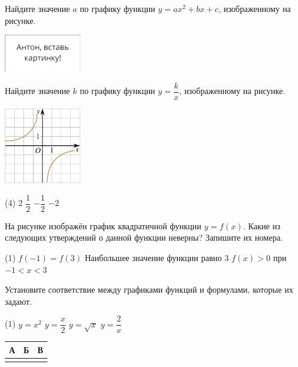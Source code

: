 \begin{class}[number=4]
	\begin{listofex}
	\item Найдите значение \( a \) по графику функции \( y=ax^2+bx+c \), изображенному на рисунке.
	\begin{center}
		\includegraphics[width=0.25\textwidth]{pics/G91M4L4-1}
	\end{center}
	\item Найдите значение \( k \) по графику функции \( y=\dfrac{k}{x} \), изображенному на рисунке.
	\begin{center}
		\includegraphics[width=0.25\textwidth]{pics/G91M4L4-2}
	\end{center}
	\begin{tasks}(4)
		\task \( 2 \)
		\task \( \dfrac{1}{2} \)
		\task \( -\dfrac{1}{2} \)
		\task \( -2 \)
	\end{tasks}
	\item На рисунке изображён график квадратичной функции \( y=f(x) \). Какие из следующих утверждений о данной функции неверны? Запишите их номера.
	\begin{tasks}(1)
		\task \( f(-1)=f(3) \)
		\task Наибольшее значение функции равно \( 3 \)
		\task \( f(x)>0 \) при \( -1<x<3 \)
	\end{tasks}
	
	\item Установите соответствие между графиками функций и формулами, которые их задают.
	\begin{tasks}(1)
		\task \( y=x^2 \)
		\task \( y=\dfrac{x}{2} \)
		\task \( y=\sqrt{x} \)
		\task \( y=\dfrac{2}{x} \)
	\end{tasks}
	\begin{center}
		\footnotesize
		\begin{tabular}{|c|c|c|}
			\hline
			А&Б&В\\
			\hline
			& & \\
			\hline
		\end{tabular}
	\end{center}
	

\end{listofex}
\end{class}
